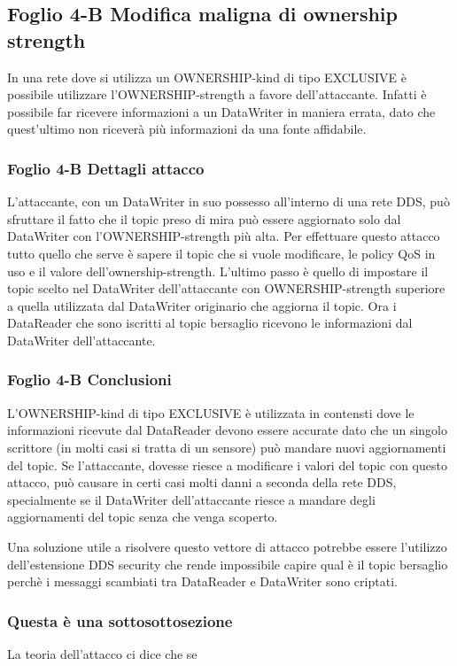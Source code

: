 \subsection{Foglio 4-B Modifica maligna di ownership strength}
In una rete dove si utilizza un OWNERSHIP-kind di tipo EXCLUSIVE è possibile
utilizzare l'OWNERSHIP-strength a favore
dell'attaccante. Infatti è possibile far ricevere informazioni a un DataWriter
in maniera errata, dato che quest'ultimo non riceverà più informazioni da
una fonte affidabile.

\subsubsection{Foglio 4-B Dettagli attacco}
L'attaccante, con un DataWriter in suo possesso all'interno di una rete DDS,
può sfruttare il fatto che il topic preso di mira può essere aggiornato
solo dal DataWriter con l'OWNERSHIP-strength più alta. 
Per effettuare questo attacco tutto quello che serve è sapere il topic che
si vuole modificare, le policy QoS in uso e il valore dell'ownership-strength.
L'ultimo passo è quello di impostare il topic scelto nel DataWriter
dell'attaccante con OWNERSHIP-strength superiore a quella utilizzata dal
DataWriter originario che aggiorna il topic.
Ora i DataReader che sono iscritti al topic bersaglio
ricevono le informazioni dal DataWriter dell'attaccante.

\subsubsection{Foglio 4-B Conclusioni}
L'OWNERSHIP-kind di tipo EXCLUSIVE è utilizzata in contensti dove le
informazioni ricevute dal DataReader devono essere accurate dato che un singolo
scrittore (in molti casi si tratta di un sensore) può mandare nuovi aggiornamenti
del topic. Se l'attaccante, dovesse riesce a modificare i valori del topic con
questo attacco, può causare in certi casi molti danni a seconda della rete DDS, 
specialmente se il DataWriter dell'attaccante riesce a mandare degli aggiornamenti
del topic senza che venga scoperto.

Una soluzione utile a risolvere questo vettore di attacco potrebbe essere l'utilizzo
dell'estensione DDS security che rende impossibile capire qual è il topic bersaglio
perchè i messaggi scambiati tra DataReader e DataWriter sono criptati.



\subsubsection{Questa è una sottosottosezione}
La teoria dell'attacco ci dice che se 

